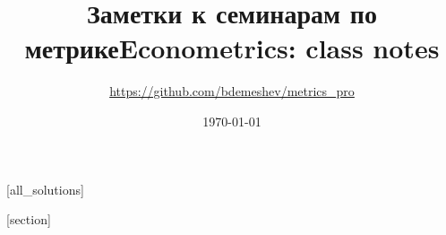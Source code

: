 \begin{translation-en}
\end{translation-en}
    


\makeatletter
\def\nobreak{\penalty\@M}
\makeatother


\usepackage[bibencoding = auto,
style = alphabetic,
backend = biber,
citestyle = alphabetic,
sorting = none]{biblatex}



\begin{translation-ru}
\title{Заметки к семинарам по метрике}    
\end{translation-ru}

\begin{translation-en}
\title{Econometrics: class notes}    
\end{translation-en}
    

\author{\url{https://github.com/bdemeshev/metrics_pro}}
\date{\today}



\usepackage{answers} %


[all_solutions]


[section]

\newenvironment{problem}%
{%
\refstepcounter{problem}%
     \hypertarget{problem:{\thesection.\theproblem}}{} %
     \Writetofile{solution_file}{\protect\hypertarget{soln:\thesection.\theproblem}{}}
     \begin{myenum}[label=\bfseries\protect\hyperlink{soln:\thesection.\theproblem}{\thesection.\theproblem},ref=\thesection.\theproblem]
     \item%
    }%
    {%
    \end{myenum}}





